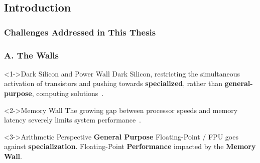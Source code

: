\graphicspath{{../../../PhD/paper_factory/thesis_louis/Chapter2/Figs/}{./figs/}}
\subsection{Introduction}
\begin{frame}
    \frametitle{Challenges Addressed in This Thesis}


\end{frame}

\begin{frame}
    \frametitle{A. The Walls}

    \begin{alertblock}<1->{Dark Silicon and Power Wall}
	    Dark Silicon, restricting the simultaneous activation of transistors and pushing towards \textbf{specialized}, rather than \textbf{general-purpose}, computing solutions~\cite{shafique_eda_2014}.
    \end{alertblock}

    \begin{alertblock}<2->{Memory Wall}
        The growing gap between processor speeds and memory latency severely limits system performance~\cite{dennard_design_1999}.
    \end{alertblock}

    \begin{block}<3->{Arithmetic Perspective}
	    \textbf{General Purpose} Floating-Point / FPU goes against \textbf{specialization}.
	    Floating-Point \textbf{Performance} impacted by the \textbf{Memory Wall}.
    \end{block}

\end{frame}


